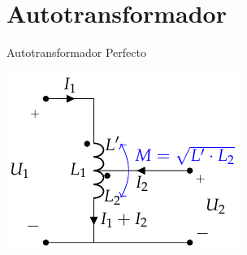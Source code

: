 \documentclass[aspectratio=169, usenames,svgnames,dvipsnames]{beamer}
\begin{document}
\section{Autotransformador}
\label{sec:org3659dd7}
\begin{frame}[label={sec:org79133da}]{Autotransformador Perfecto}
\begin{center}
\includegraphics[height=0.9\textheight]{../figs/AutotrafoPerfecto.pdf}
\end{center}
\end{frame}
\end{document}

